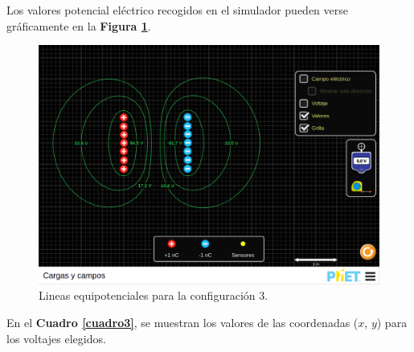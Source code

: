 \documentclass[letter,11pt]{article}
\begin{document}
Los valores potencial eléctrico recogidos en el simulador pueden verse
gráficamente en la \textbf{Figura \ref{figura9}}.

\begin{figure}[!h]
\centering
\includegraphics[scale=0.34]{resources/figura09.eps}
\caption{Lineas equipotenciales para la configuración 3.}
\label{figura9}
\end{figure}

En el \textbf{Cuadro \ref{cuadro3}}, se muestran los valores de las coordenadas
($x$, $y$) para los voltajes elegidos.
\end{document}
